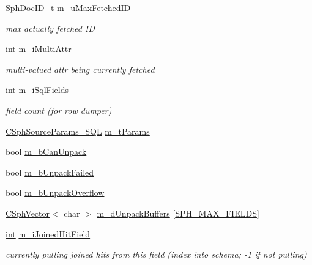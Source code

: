 \begin{DoxyCompactItemize}
\hyperlink{sphinx_8h_a3176771631c12a9e4897272003e6b447}{Sph\-Doc\-I\-D\-\_\-t} \hyperlink{structCSphSource__SQL_a7ed6450b19c762fe5911c6d13bcb1398}{m\-\_\-u\-Max\-Fetched\-I\-D}
\begin{DoxyCompactList}\small\item\em max actually fetched I\-D \end{DoxyCompactList}\item 
\hyperlink{sphinxexpr_8cpp_a4a26e8f9cb8b736e0c4cbf4d16de985e}{int} \hyperlink{structCSphSource__SQL_a5ac61b46c7c45963bc415966f25c413d}{m\-\_\-i\-Multi\-Attr}
\begin{DoxyCompactList}\small\item\em multi-\/valued attr being currently fetched \end{DoxyCompactList}\item 
\hyperlink{sphinxexpr_8cpp_a4a26e8f9cb8b736e0c4cbf4d16de985e}{int} \hyperlink{structCSphSource__SQL_aa9a5b3f39074872fcd92a73b3f2abb9a}{m\-\_\-i\-Sql\-Fields}
\begin{DoxyCompactList}\small\item\em field count (for row dumper) \end{DoxyCompactList}\item 
\hyperlink{structCSphSourceParams__SQL}{C\-Sph\-Source\-Params\-\_\-\-S\-Q\-L} \hyperlink{structCSphSource__SQL_a2974c9329104af25bd20950d951f25ec}{m\-\_\-t\-Params}
\item 
bool \hyperlink{structCSphSource__SQL_a84e0d1afeedf2ae246724fd59e5cf8b1}{m\-\_\-b\-Can\-Unpack}
\item 
bool \hyperlink{structCSphSource__SQL_a95c8c8eff2e6ce507dc5d63f3f74eea8}{m\-\_\-b\-Unpack\-Failed}
\item 
bool \hyperlink{structCSphSource__SQL_ae0150574c72c11d0f630c9efd139a659}{m\-\_\-b\-Unpack\-Overflow}
\item 
\hyperlink{classCSphVector}{C\-Sph\-Vector}$<$ char $>$ \hyperlink{structCSphSource__SQL_aa2cbb5ff03e0afa3821facb61533f3d5}{m\-\_\-d\-Unpack\-Buffers} \mbox{[}\hyperlink{sphinx_8h_ad5336c1a92b4f76b012a1a868a85b874}{S\-P\-H\-\_\-\-M\-A\-X\-\_\-\-F\-I\-E\-L\-D\-S}\mbox{]}
\item 
\hyperlink{sphinxexpr_8cpp_a4a26e8f9cb8b736e0c4cbf4d16de985e}{int} \hyperlink{structCSphSource__SQL_a89c1ec7e37fab24e70f55ac3b3da4c07}{m\-\_\-i\-Joined\-Hit\-Field}
\begin{DoxyCompactList}\small\item\em currently pulling joined hits from this field (index into schema; -\/1 if not pulling) \end{DoxyCompactList}\item 

\end{DoxyCompactItemize}
